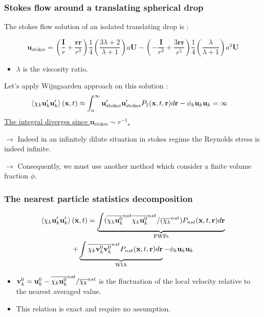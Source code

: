 \documentclass{sintefbeamer}
\begin{document}
\begin{frame}
  \frametitle{Stokes flow around a translating spherical drop}
  The stokes flow solution of an isolated translating drop is :

  \begin{equation*}
    \textbf{u}_\text{stokes} 
    = \left(\frac{ \textbf{I}}{r} + \frac{\textbf{rr}}{r^3}\right)  \frac{1}{4}\left(\frac{3\lambda + 2}{\lambda +1}\right) a \textbf{U}
    - \left(-\frac{\textbf{I}}{r^3} + \frac{3 \textbf{rr} }{r^5}\right)  \frac{1}{4}\left(\frac{\lambda}{\lambda +1}\right) a^3 \textbf{U}
  \end{equation*}

  \begin{itemize}
    \item $\lambda$ is the viscosity ratio.
  \end{itemize}
  
  Let's apply Wijngaarden approach on this solution : 
  \begin{align*}
    \left<\chi_k \textbf{u}'_k\textbf{u}'_k\right>(\textbf{x},t)
    &\approx \int_a^\infty \textbf{u}'_\text{stokes}\textbf{u}'_\text{stokes}  P_1(\textbf{x},t,\textbf{r}) d\textbf{r}
    - \phi_k \textbf{u}_k\textbf{u}_k
    =\infty 
  \end{align*}
  \underline{The integral diverges since $\textbf{u}_\text{stokes} \sim r^{-1}$.}

  $\to$ Indeed in an infinitely dilute situation in stokes regime the Reynolds stress is indeed infinite.

  $\to$ Consequently, we must use another method which consider a finite volume fraction $\phi$. 
\end{frame}

\begin{frame}
  \frametitle{The nearest particle statistics decomposition}
  \begin{multline*}
    \left<\chi_k \textbf{u}'_k\textbf{u}'_k\right>(\textbf{x},t)
    = 
    \underbrace{\int (\overline{\chi_k \textbf{u}^0_k}^{nst}  \overline{\chi_k \textbf{u}^0_k}^{nst} / (\overline{\chi_k}^{nst})  P_{nst}(\textbf{x},t,\textbf{r}) d\textbf{r} }_\text{PWFs}
    \\+\underbrace{\int \overline{\chi_k \textbf{v}_k^0\textbf{v}_k^0}^{nst}  P_{nst}(\textbf{x},t,\textbf{r}) d\textbf{r}}_\text{WIA}
    - \phi_k \textbf{u}_k\textbf{u}_k
  \end{multline*}

\begin{itemize}
  \item $\textbf{v}_k^0  = \textbf{u}_k^0 - \overline{\chi_k \textbf{u}^0_k}^{nst} / \overline{\chi_k}^{nst}$ is the fluctuation of the local velocity relative to the nearest averaged value. 
  \item This relation is exact and require no assumption. 
\end{itemize}
\end{frame}
\end{document}
